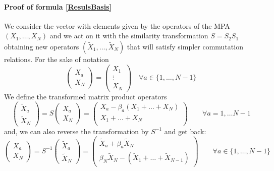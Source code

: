 \documentclass[10pt]{article}
\numberwithin{equation}{section}
\numberwithin{equation}{subsection}
\newcommand{\Xt}{\widetilde{X}}
\begin{document}
\paragraph{Proof of formula \eqref{ResulsBasis}} 
We consider the vector with elements given by the operators of the MPA $(X_{1},\ldots,X_{N})$ and we act on it with the similarity transformation $S=S_{2}S_{1}$ obtaining new operators $(\Xt_{1},\ldots,\Xt_{N})$ that will satisfy simpler commutation relations. 
For the sake of notation 
\begin{equation}
    \begin{pmatrix}
		X_{a}\\ 
		X_{N}
	\end{pmatrix}=\begin{pmatrix}
	    X_{1}\\
     \vdots\\
     X_{N}
	\end{pmatrix}\quad \forall a\in \{1,\ldots,N-1\}
\end{equation}
We define the transformed matrix product operators
\begin{equation}\label{Xtildes2b}
	\begin{pmatrix}
		\Xt_{a}\\ 
		\Xt_{N}
	\end{pmatrix} =S\begin{pmatrix}
		X_{a}\\X_{N}
	\end{pmatrix}=\begin{pmatrix} 
		X_{a}-\beta_{a}(X_{1}+\ldots+X_{N})\\
				X_{1}+\ldots +X_{N}\\
	\end{pmatrix}%
	\qquad \forall a=1,\ldots N-1
\end{equation}
and, we can also reverse the transformation by $S^{-1}$ and get back: 
\begin{equation}\label{Xes}
	\begin{pmatrix}
		X_{a}\\
		X_{N} 
	\end{pmatrix} =S^{-1}\begin{pmatrix}
		\widetilde{X}_{a}\\
		\widetilde{X}_{N}
	\end{pmatrix}=\begin{pmatrix}
		\Xt_{a}+\beta_{a}\Xt_{N}\\ 
		\beta_N\Xt_{N}-(\Xt_{1}+\ldots+\Xt_{N-1})
	\end{pmatrix}\qquad\forall a\in \{1,\ldots,N-1\}
\end{equation}
\end{document}
